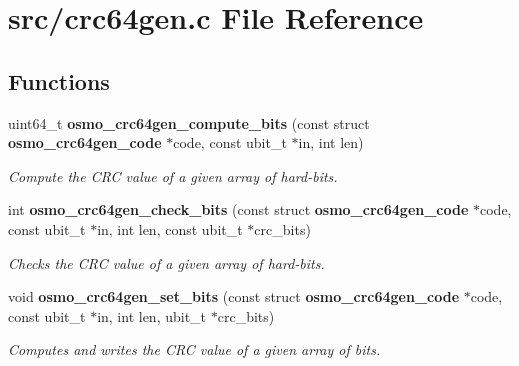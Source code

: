 \section{src/crc64gen.c File Reference}
\label{crc64gen_8c}
\subsection*{Functions}
\begin{DoxyCompactItemize}
\item 
uint64\-\_\-t {\bf osmo\-\_\-crc64gen\-\_\-compute\-\_\-bits} (const struct {\bf osmo\-\_\-crc64gen\-\_\-code} $\ast$code, const ubit\-\_\-t $\ast$in, int len)
\begin{DoxyCompactList}\small\item\em Compute the C\-R\-C value of a given array of hard-\/bits. \end{DoxyCompactList}\item 
int {\bf osmo\-\_\-crc64gen\-\_\-check\-\_\-bits} (const struct {\bf osmo\-\_\-crc64gen\-\_\-code} $\ast$code, const ubit\-\_\-t $\ast$in, int len, const ubit\-\_\-t $\ast$crc\-\_\-bits)
\begin{DoxyCompactList}\small\item\em Checks the C\-R\-C value of a given array of hard-\/bits. \end{DoxyCompactList}\item 
void {\bf osmo\-\_\-crc64gen\-\_\-set\-\_\-bits} (const struct {\bf osmo\-\_\-crc64gen\-\_\-code} $\ast$code, const ubit\-\_\-t $\ast$in, int len, ubit\-\_\-t $\ast$crc\-\_\-bits)
\begin{DoxyCompactList}\small\item\em Computes and writes the C\-R\-C value of a given array of bits. \end{DoxyCompactList}\end{DoxyCompactItemize}

